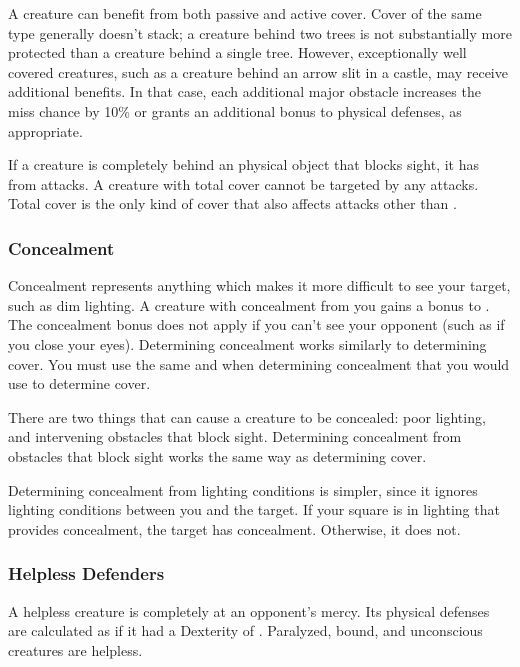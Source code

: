             A creature can benefit from both passive and active cover.
            Cover of the same type generally doesn't stack; a creature behind two trees is not substantially more protected than a creature behind a single tree.
            However, exceptionally well covered creatures, such as a creature behind an arrow slit in a castle, may receive additional benefits.
            In that case, each additional major obstacle increases the miss chance by 10\% or grants an additional  bonus to physical defenses, as appropriate.

            \label{Total Cover}
            If a creature is completely behind an physical object that blocks sight, it has  from attacks.
            A creature with total cover cannot be targeted by any attacks.
            Total cover is the only kind of cover that also affects attacks other than .

        \subsubsection{Concealment}\label{Concealment}
            Concealment represents anything which makes it more difficult to see your target, such as dim lighting. A creature with concealment from you gains a  bonus to . The concealment bonus does not apply if you can't see your opponent (such as if you close your eyes).
            Determining concealment works similarly to determining cover.
            You must use the same  and  when determining concealment that you would use to determine cover.

             There are two things that can cause a creature to be concealed: poor lighting, and intervening obstacles that block sight.
            Determining concealment from obstacles that block sight works the same way as determining cover.

            Determining concealment from lighting conditions is simpler, since it ignores lighting conditions between you and the target.
            If your  square is in lighting that provides concealment, the target has concealment.
            Otherwise, it does not.

        \subsubsection{Helpless Defenders}
            A helpless creature is completely at an opponent's mercy.
            Its physical defenses are calculated as if it had a Dexterity of .
            Paralyzed, bound, and unconscious creatures are helpless.

